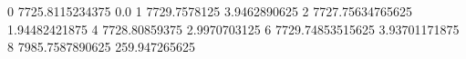 0 7725.8115234375 0.0
1 7729.7578125 3.9462890625
2 7727.75634765625 1.94482421875
4 7728.80859375 2.9970703125
6 7729.74853515625 3.93701171875
8 7985.7587890625 259.947265625
